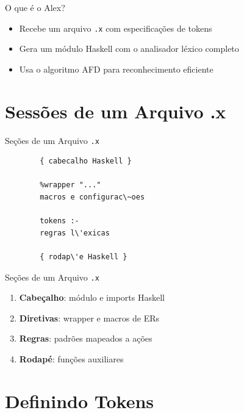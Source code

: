 \begin{frame}[fragile]{O que é o Alex?}

    \begin{itemize}

        \item
        Recebe um arquivo \texttt{.x} com especificações de
        tokens
        \item
        Gera um módulo Haskell com o analisador léxico completo
        \item
        Usa o algoritmo AFD para reconhecimento eficiente
    \end{itemize}
\end{frame}


\section{Sessões de um Arquivo .x}\label{sessuxf5es-de-um-arquivo-.x}

\begin{frame}[fragile]{Seções de um Arquivo
    \texttt{.x}}

    \begin{lstlisting}
        { cabecalho Haskell }

        %wrapper "..."
        macros e configurac\~oes

        tokens :-
        regras l\'exicas

        { rodap\'e Haskell }
    \end{lstlisting}
\end{frame}

\begin{frame}{Seções de um Arquivo \texttt{.x}}

    \begin{enumerate}

        \item
        \textbf{Cabeçalho}: módulo e imports Haskell
        \item
        \textbf{Diretivas}: wrapper e macros de ERs
        \item
        \textbf{Regras}: padrões mapeados a ações
        \item
        \textbf{Rodapé}: funções auxiliares
    \end{enumerate}
\end{frame}


\section{Definindo Tokens}\label{definindo-tokens}

